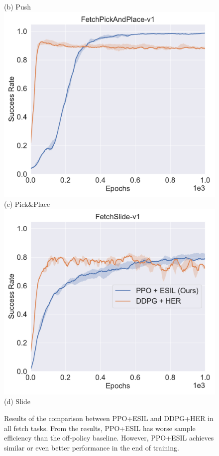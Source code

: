 \begin{figure}[h!]
  ({b}) Push
\endminipage\hfill
{}%
  \centering
  \includegraphics[width=\linewidth]{figures/chapter3/pick_her.pdf}
  ({c}) Pick$\&$Place
\endminipage
{}%
  \centering
  \includegraphics[width=\linewidth]{figures/chapter3/slide_her.pdf}
  ({d}) Slide
\endminipage\hfill
\caption[Comparison between ESIL and DDPG+HER.]{Results of the comparison between PPO+ESIL and DDPG+HER in all fetch tasks. From the results, PPO+ESIL has worse sample efficiency than the off-policy baseline. However, PPO+ESIL achieves similar or even better performance in the end of training.}
\label{fig:her_compare}
\end{figure}

